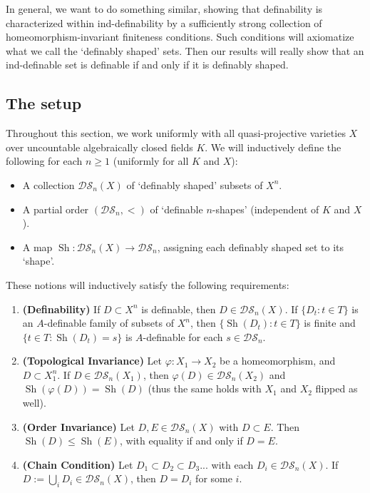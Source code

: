 \documentclass{amsart}
\theoremstyle{definition}
\begin{document}
In general, we want to do something similar, showing that definability is characterized within ind-definability by a sufficiently strong collection of homeomorphism-invariant finiteness conditions. Such conditions will axiomatize what we call the `definably shaped' sets. Then our results will really show that an ind-definable set is definable if and only if it is definably shaped.

\subsection{The setup}

Throughout this section, we work uniformly with all quasi-projective varieties $X$ over uncountable algebraically closed fields $K$. We will inductively define the following for each $n\geq 1$ (uniformly for all $K$ and $X$): 

\begin{itemize}
    \item A collection $\mathcal{DS}_n(X)$ of `definably shaped' subsets of $X^n$.
    \item A partial order $(\mathcal{DS}_n,<)$ of `definable $n$-shapes' (independent of $K$ and $X$).
    \item A map $\operatorname{Sh}:\mathcal{DS}_n(X)\rightarrow\mathcal{DS}_n$, assigning each definably shaped set to its `shape'.
\end{itemize}

These notions will inductively satisfy the following requirements:

\begin{enumerate}
    \item \textbf{(Definability)} If $D\subset X^n$ is definable, then $D\in\mathcal{DS}_n(X)$. If $\{D_t:t\in T\}$ is an $A$-definable family of subsets of $X^n$, then $\{\operatorname{Sh}(D_t):t\in T\}$ is finite and $\{t\in T:\operatorname{Sh}(D_t)=s\}$ is $A$-definable for each $s\in\mathcal{DS}_n$.
    \item \textbf{(Topological Invariance)} Let $\varphi:X_1\rightarrow X_2$ be a homeomorphism, and $D\subset X_1^n$. If $D\in\mathcal{DS}_n(X_1)$, then $\varphi(D)\in\mathcal{DS}_n(X_2)$ and $\operatorname{Sh}(\varphi(D))=\operatorname{Sh}(D)$ (thus the same holds with $X_1$ and $X_2$ flipped as well).
    \item \textbf{(Order Invariance)} Let $D,E\in\mathcal{DS}_n(X)$ with $D\subset E$. Then $\operatorname{Sh}(D)\leq\operatorname{Sh}(E)$, with equality if and only if $D=E$.
    \item \textbf{(Chain Condition)} Let $D_1\subset D_2\subset D_3...$ with each $D_i\in\mathcal{DS}_n(X)$. If $D:=\bigcup_iD_i\in\mathcal{DS}_n(X)$, then $D=D_i$ for some $i$. 
\end{enumerate}
\end{document}
